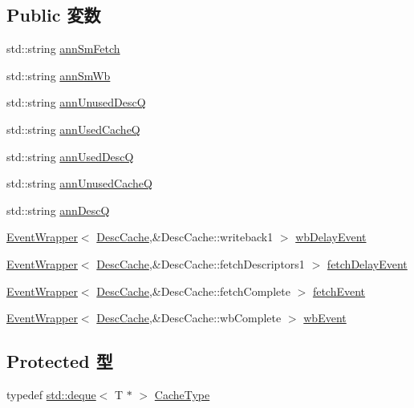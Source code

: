 \subsection*{Public 変数}
\begin{DoxyCompactItemize}
\item 
std::string \hyperlink{classIGbE_1_1DescCache_afa0b0aa4b6539cf61d33c27e35c809a1}{annSmFetch}
\item 
std::string \hyperlink{classIGbE_1_1DescCache_af0c632f8282132e3abbbe879fcdea126}{annSmWb}
\item 
std::string \hyperlink{classIGbE_1_1DescCache_a7cc80d85ecc41b9f0e262b9ad332fc76}{annUnusedDescQ}
\item 
std::string \hyperlink{classIGbE_1_1DescCache_a6ee5c97cfcef9e794d9691f2d11454aa}{annUsedCacheQ}
\item 
std::string \hyperlink{classIGbE_1_1DescCache_a7fe6b65fb10d40a843ce4e8925062aa6}{annUsedDescQ}
\item 
std::string \hyperlink{classIGbE_1_1DescCache_aa1b65175b7b2bc6609744ebc8657ac7d}{annUnusedCacheQ}
\item 
std::string \hyperlink{classIGbE_1_1DescCache_a710b789ff37ebd40141ea5d4239cb50d}{annDescQ}
\item 
\hyperlink{classEventWrapper}{EventWrapper}$<$ \hyperlink{classIGbE_1_1DescCache}{DescCache},\&DescCache::writeback1 $>$ \hyperlink{classIGbE_1_1DescCache_a20fa57c5779fd6371598e36d8ba9a5aa}{wbDelayEvent}
\item 
\hyperlink{classEventWrapper}{EventWrapper}$<$ \hyperlink{classIGbE_1_1DescCache}{DescCache},\&DescCache::fetchDescriptors1 $>$ \hyperlink{classIGbE_1_1DescCache_a31cb5aa7ad676c587a8b467dfd762b9b}{fetchDelayEvent}
\item 
\hyperlink{classEventWrapper}{EventWrapper}$<$ \hyperlink{classIGbE_1_1DescCache}{DescCache},\&DescCache::fetchComplete $>$ \hyperlink{classIGbE_1_1DescCache_a663aeb25d4224f8d4cbe8d4e1fe3d7d3}{fetchEvent}
\item 
\hyperlink{classEventWrapper}{EventWrapper}$<$ \hyperlink{classIGbE_1_1DescCache}{DescCache},\&DescCache::wbComplete $>$ \hyperlink{classIGbE_1_1DescCache_ae9ac7c384feda84fd885f523f0ce5f73}{wbEvent}
\end{DoxyCompactItemize}
\subsection*{Protected 型}
\begin{DoxyCompactItemize}
\item 
typedef \hyperlink{classstd_1_1deque}{std::deque}$<$ T $\ast$ $>$ \hyperlink{classIGbE_1_1DescCache_a1587fdc5fc2e56988bee51b7a035cd30}{CacheType}
\end{DoxyCompactItemize}

